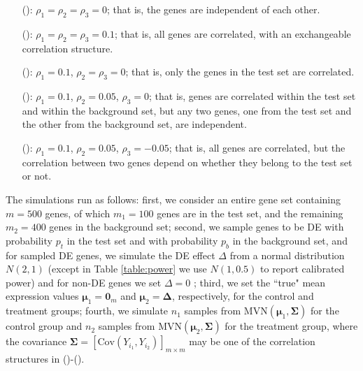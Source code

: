 	\begin{enumerate}
		\item[(\aaCase):] $\rho_1 = \rho_2 = \rho_3 = 0$; that is, the genes are independent of each
		other.
		\item[(\cCase):] $\rho_1 = \rho_2 = \rho_3 = 0.1$; that is, all genes are correlated, with 
		an exchangeable correlation structure. 
		\item[(\aCase):] $\rho_1 = 0.1$, $\rho_2 = \rho_3 = 0$; that is, only the genes in the test 
		set are correlated.%
		\item[(\eCase):] $\rho_1 = 0.1$, $\rho_2 = 0.05$, $\rho_3 = 0$; that is, 
		genes are correlated within the test set and within the background set, but any two genes, 
		one from the test set and the other from the background set, are independent.
		\item[(\fCase):] $\rho_1 = 0.1$, $\rho_2 = 0.05$, $\rho_3 = -0.05$; that is, all genes are
		correlated, but the correlation between two genes depend on whether they belong to the test 
		set or not.
	\end{enumerate}
	
	The simulations run as follows: first, we consider an entire gene set containing $m=500$ genes,
	of which $m_1 = 100$ genes are in the test set, and the
	remaining $m_2=400$ genes in the background set; second, we sample genes to be DE with 
	probability $p_t$ in the test set and with probability $p_b$ in the background set, and for 
	sampled DE genes, we simulate the DE effect $\Delta$ from  a normal distribution $N(2, 1)$ 
	(except in Table \ref{table:power} we use $N(1, 0.5)$ to report calibrated power) and for 
	non-DE genes we set $\Delta= 0$ ; third, we set the ``true" mean expression values $\bm \mu_1 = 
	\bm 0_m$ and $\bm \mu_2 = \bm \Delta$, respectively, for the control and treatment groups; 
	fourth, we simulate $n_1$ samples from $\text{MVN}(\bm \mu_1, \bm \Sigma)$ for the control 
	group and $n_2$ samples from $\text{MVN}(\bm \mu_2, \bm \Sigma)$ for
	the treatment group, where the covariance $\bm \Sigma = \left[\text{Cov}(Y_{i_1},
	Y_{i_2})\right]_{m\times m}$ may be one of the correlation structures in (\aaCase)-(\fCase).
	
